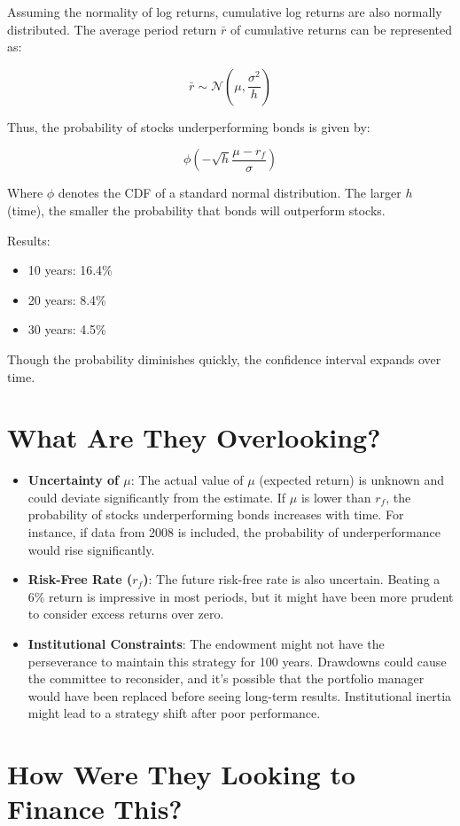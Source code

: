 \documentclass{article}
\begin{document}
Assuming the normality of log returns, cumulative log returns are also normally distributed. The average period return $\bar{r}$ of cumulative returns can be represented as:

\[
\bar{r} \sim \mathcal{N}(\mu, \frac{\sigma^2}{h})
\]

Thus, the probability of stocks underperforming bonds is given by:

\[
\phi\left(-\sqrt{h} \frac{\mu - r_f}{\sigma}\right)
\]

Where $\phi$ denotes the CDF of a standard normal distribution. The larger $h$ (time), the smaller the probability that bonds will outperform stocks.

Results:
\begin{itemize}
    \item 10 years: 16.4\%
    \item 20 years: 8.4\%
    \item 30 years: 4.5\%
\end{itemize}

Though the probability diminishes quickly, the confidence interval expands over time.

\section{What Are They Overlooking?}
\begin{itemize}
    \item \textbf{Uncertainty of $\mu$}: The actual value of $\mu$ (expected return) is unknown and could deviate significantly from the estimate. If $\mu$ is lower than $r_f$, the probability of stocks underperforming bonds increases with time. For instance, if data from 2008 is included, the probability of underperformance would rise significantly.
    \item \textbf{Risk-Free Rate ($r_f$)}: The future risk-free rate is also uncertain. Beating a 6\% return is impressive in most periods, but it might have been more prudent to consider excess returns over zero.
    \item \textbf{Institutional Constraints}: The endowment might not have the perseverance to maintain this strategy for 100 years. Drawdowns could cause the committee to reconsider, and it's possible that the portfolio manager would have been replaced before seeing long-term results. Institutional inertia might lead to a strategy shift after poor performance.
\end{itemize}

\section{How Were They Looking to Finance This?}
\end{document}
